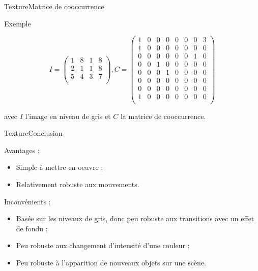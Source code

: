 \begin{frame}{Texture}{Matrice de cooccurrence}

\begin{exampleblock}{Exemple}

\[
 I = \begin{pmatrix}
     1 & 8 & 1 & 8 \\
     2 & 1 & 1 & 8 \\
     5 & 4 & 3 & 7 \\     
 \end{pmatrix}
, 
 C = \begin{pmatrix}
     1 & 0 & 0 & 0 & 0 & 0 & 0 & 3 \\
     1 & 0 & 0 & 0 & 0 & 0 & 0 & 0 \\
     0 & 0 & 0 & 0 & 0 & 0 & 1 & 0 \\
     0 & 0 & 1 & 0 & 0 & 0 & 0 & 0 \\
     0 & 0 & 0 & 1 & 0 & 0 & 0 & 0 \\
     0 & 0 & 0 & 0 & 0 & 0 & 0 & 0 \\
     0 & 0 & 0 & 0 & 0 & 0 & 0 & 0 \\
     1 & 0 & 0 & 0 & 0 & 0 & 0 & 0 \\   
 \end{pmatrix}
\]

avec $I$ l'image en niveau de gris et $C$ la matrice de cooccurrence.

\end{exampleblock}

\end{frame}

\begin{frame}{Texture}{Conclusion}

\begin{block}{Avantages :}

\begin{itemize}
    \item Simple à mettre en oeuvre ;
    \item Relativement robuste aux mouvements.
\end{itemize}

\end{block}

\begin{block}{Inconvénients :}

\begin{itemize}
    \item Basée sur les niveaux de gris, donc peu robuste aux transitions avec un effet de fondu ;
   	\item Peu robuste aux changement d'intensité d'une couleur ;
   	\item Peu robuste à l'apparition de nouveaux objets sur une scène.
\end{itemize}

\end{block}

\end{frame}

